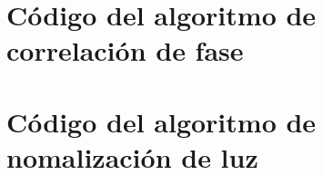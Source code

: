 \documentclass[a4paper,openright, 12pt]{book}
\begin{document}
\section{Código del algoritmo de correlación de fase} \label{ap_pc}

\section{Código del algoritmo de nomalización de luz} \label{ap_luz}

\cleardoublepage
{}
\nocite{*}
\end{document}
